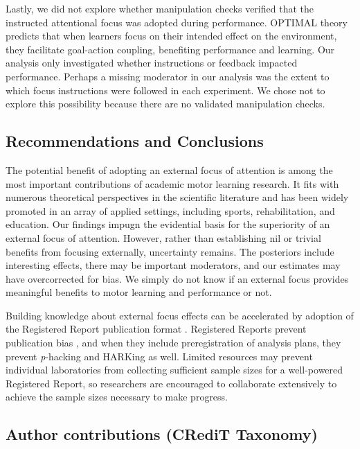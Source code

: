\documentclass[man,floatsintext,letterpaper,12pt]{apa7}
\begin{document}
Lastly, we did not explore whether manipulation checks verified that the instructed attentional focus was adopted during performance. OPTIMAL theory predicts that when learners focus on their intended effect on the environment, they facilitate goal-action coupling, benefiting performance and learning. Our analysis only investigated whether instructions or feedback impacted performance. Perhaps a missing moderator in our analysis was the extent to which focus instructions were followed in each experiment. We chose not to explore this possibility because there are no validated manipulation checks.

\subsection{Recommendations and Conclusions}

The potential benefit of adopting an external focus of attention is among the most important contributions of academic motor learning research. It fits with numerous theoretical perspectives in the scientific literature and has been widely promoted in an array of applied settings, including sports, rehabilitation, and education. Our findings impugn the evidential basis for the superiority of an external focus of attention. However, rather than establishing nil or trivial benefits from focusing externally, uncertainty remains. The posteriors include interesting effects, there may be important moderators, and our estimates may have overcorrected for bias. We simply do not know if an external focus provides meaningful benefits to motor learning and performance or not.

Building knowledge about external focus effects can be accelerated by adoption of the Registered Report publication format \autocite{chambers2019}. Registered Reports prevent publication bias \autocite{scheel2021}, and when they include preregistration of analysis plans, they prevent \emph{p}-hacking \autocite{simmons2011} and HARKing \autocite{kerr1998} as well. Limited resources may prevent individual laboratories from collecting sufficient sample sizes for a well-powered Registered Report, so researchers are encouraged to collaborate extensively to achieve the sample sizes necessary to make progress.

\newpage

\subsection{Author contributions (CRediT Taxonomy)}
\end{document}

